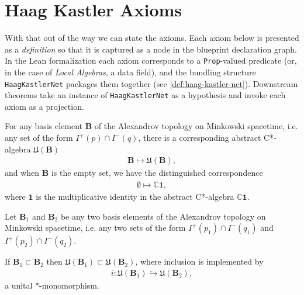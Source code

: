 \section{Haag Kastler Axioms}\label{sctn:haag-kastler-axioms}
With that out of the way we can state the axioms. Each axiom below is presented as a \emph{definition} so that it is captured as a node in the blueprint declaration graph. In the Lean formalization each axiom corresponds to a \texttt{Prop}-valued predicate (or, in the case of \emph{Local Algebras}, a data field), and the bundling structure \texttt{HaagKastlerNet} packages them together (see \cref{def:haag-kastler-net}). Downstream theorems take an instance of \texttt{HaagKastlerNet} as a hypothesis and invoke each axiom as a projection.

\begin{definition}
    \label{def:local-algebras}
    \leanok
    For any basis element $\mathbf{B}$ of the Alexandrov topology on Minkowski spacetime, i.e. any set of the form $I^+(p) \cap I^-(q)$, there is a corresponding abstract C*-algebra $\mathfrak{U}(\mathbf{B})$
    \begin{align}
        \mathbf{B} \longmapsto \mathfrak{U}(\mathbf{B}),
    \end{align}
    and when $\mathbf{B}$ is the empty set, we have the distinguished correspondence
    \begin{align}
        \emptyset \longmapsto \mathbb{C} \mathbf{1},
    \end{align}
    where $\mathbf{1}$ is the multiplicative identity in the abstract C*-algebra $\mathbb{C} \mathbf{1}$.
\end{definition}

\begin{definition}
    \label{def:isotony}
    \leanok
    Let $\mathbf{B}_1$ and $\mathbf{B}_2$ be any two basis elements of the Alexandrov topology on Minkowski spacetime, i.e. any two sets of the form $I^+(p_1) \cap I^-(q_1)$ and $I^+(p_2) \cap I^-(q_2)$.

    If $\mathbf{B}_1 \subset \mathbf{B}_2$ then $\mathfrak{U}(\mathbf{B}_1) \subset \mathfrak{U}(\mathbf{B}_2)$, where inclusion is implemented by
    \begin{align}
        i : \mathfrak{U}(\mathbf{B}_1) \hookrightarrow \mathfrak{U}(\mathbf{B}_2),
    \end{align}
    a unital *-monomorphism.
\end{definition}


